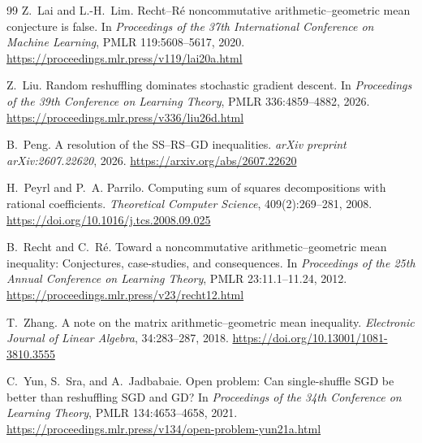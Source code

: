 \documentclass[11pt]{article}
\begin{document}
\begin{thebibliography}{99}
Z.~Lai and L.-H.~Lim.
Recht--R\'e noncommutative arithmetic--geometric mean conjecture is false.
In \emph{Proceedings of the 37th International Conference on Machine Learning},
PMLR 119:5608--5617, 2020.
\url{https://proceedings.mlr.press/v119/lai20a.html}

Z.~Liu.
Random reshuffling dominates stochastic gradient descent.
In \emph{Proceedings of the 39th Conference on Learning Theory},
PMLR 336:4859--4882, 2026.
\url{https://proceedings.mlr.press/v336/liu26d.html}

B.~Peng.
A resolution of the SS--RS--GD inequalities.
\emph{arXiv preprint arXiv:2607.22620}, 2026.
\url{https://arxiv.org/abs/2607.22620}

H.~Peyrl and P.~A. Parrilo.
Computing sum of squares decompositions with rational coefficients.
\emph{Theoretical Computer Science}, 409(2):269--281, 2008.
\url{https://doi.org/10.1016/j.tcs.2008.09.025}

B.~Recht and C.~R\'e.
Toward a noncommutative arithmetic--geometric mean inequality:
Conjectures, case-studies, and consequences.
In \emph{Proceedings of the 25th Annual Conference on Learning Theory},
PMLR 23:11.1--11.24, 2012.
\url{https://proceedings.mlr.press/v23/recht12.html}

T.~Zhang.
A note on the matrix arithmetic--geometric mean inequality.
\emph{Electronic Journal of Linear Algebra}, 34:283--287, 2018.
\url{https://doi.org/10.13001/1081-3810.3555}

C.~Yun, S.~Sra, and A.~Jadbabaie.
Open problem: Can single-shuffle SGD be better than reshuffling SGD and GD?
In \emph{Proceedings of the 34th Conference on Learning Theory},
PMLR 134:4653--4658, 2021.
\url{https://proceedings.mlr.press/v134/open-problem-yun21a.html}

\end{thebibliography}
\end{document}
